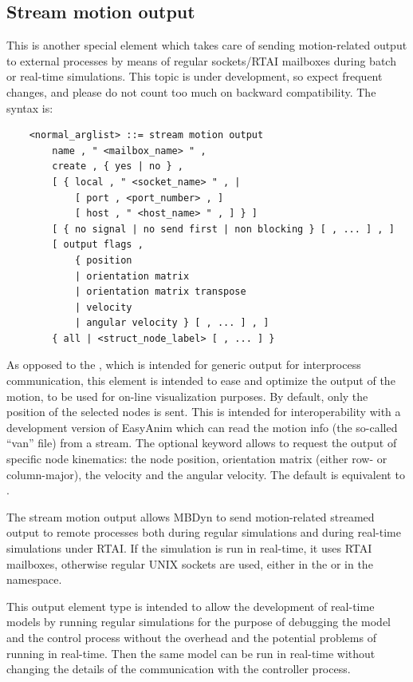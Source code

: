 \subsection{Stream motion output}\label{sec:EL:BASE:STREAM_MOTION_OUTPUT}
This is another special element which takes care of sending motion-related
output to external processes by means of regular sockets/RTAI mailboxes
during batch or real-time simulations.
This topic is under development, so expect frequent changes, and
please do not count too much on backward compatibility.
The syntax is:
\begin{verbatim}
    <normal_arglist> ::= stream motion output
        name , " <mailbox_name> " ,
        create , { yes | no } ,
        [ { local , " <socket_name> " , |
            [ port , <port_number> , ]
            [ host , " <host_name> " , ] } ]
        [ { no signal | no send first | non blocking } [ , ... ] , ]
        [ output flags ,
            { position
            | orientation matrix
            | orientation matrix transpose
            | velocity
            | angular velocity } [ , ... ] , ]
        { all | <struct_node_label> [ , ... ] }
\end{verbatim}
As opposed to the , which is intended for generic
output for interprocess communication, this element is intended to ease
and optimize the output of the motion, to be used for on-line visualization
purposes.
By default, only the position of the selected nodes is sent.
This is intended for interoperability with a development version
of EasyAnim which can read the motion info (the so-called ``van'' file)
from a stream.
The optional keyword  allows to request the output
of specific node kinematics: the node position, orientation matrix
(either row- or column-major), the velocity and the angular velocity.
The default is equivalent to .

The stream motion output allows MBDyn to send motion-related streamed output 
to remote processes both during regular simulations and during 
real-time simulations under RTAI.
If the simulation is run in real-time, it uses RTAI mailboxes, 
otherwise regular UNIX sockets are used, either in the  or 
in the  namespace.

This output element type is intended to allow the development 
of real-time models by running regular simulations for the purpose 
of debugging the model and the control process without the overhead 
and the potential problems of running in real-time.
Then the same model can be run in real-time without changing the details
of the communication with the controller process.

